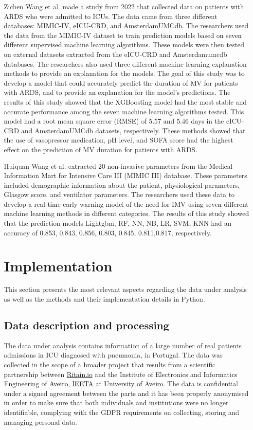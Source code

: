 \documentclass[journal]{IEEEtran} %
\begin{document}
Zichen Wang et al. \cite{Wang2022} made a study from 2022 that collected data on patients with ARDS who were admitted to ICUs. The data came from three different databases: MIMIC-IV, eICU-CRD, and AmsterdamUMCdb. The researchers used the data from the MIMIC-IV dataset to train prediction models based on seven different supervised machine learning algorithms. These models were then tested on external datasets extracted from the eICU-CRD and Amsterdamumcdb databases. The researchers also used three different machine learning explanation methods to provide an explanation for the models. The goal of this study was to develop a model that could accurately predict the duration of MV for patients with ARDS, and to provide an explanation for the model's predictions. The results of this study showed that the XGBoosting model had the most stable and accurate performance among the seven machine learning algorithms tested. This model had a root mean square error (RMSE) of 5.57 and 5.46 days in the eICU-CRD and AmsterdamUMCdb datasets, respectively. These methods showed that the use of vasopressor medication, pH level, and SOFA score had the highest effect on the prediction of MV duration for patients with ARDS.

Huiquan Wang et al. \cite{Wang2023} extracted 20 non-invasive parameters from the Medical Information Mart for Intensive Care III (MIMIC III) database. These parameters included demographic information about the patient, physiological parameters, Glasgow score, and ventilator parameters. The researchers used these data to develop a real-time early warning model of the need for IMV using seven different machine learning methods in different categories. The results of this study showed that the prediction models Lightgbm, RF, NN, NB, LR, SVM, KNN had an accuracy of 0.853, 0.843, 0.856, 0.803, 0.845, 0.811,0.817, respectively.

\section{Implementation}

This section presents the most relevant aspects regarding the data under analysis as well as the methods and their implementation details in Python.

\subsection{Data description and processing}
The data under analysis contains information of a large number of real patients admissions in ICU diagnosed with pneumonia, in Portugal.
The data was collected in the scope of a broader project that results from a scientific partnership between \hyperlink{https://ritain.io}{Ritain.io} and the Institute of Electronics and Informatics Engineering of Aveiro, \hyperlink{http://www.ieeta.pt/}{IEETA} at University of Aveiro. The data is confidential under a signed agreement between the parts and it has been properly anonymised in order to make sure that both individuals and institutions were no longer identifiable, complying with the GDPR requirements on collecting, storing and managing personal data.
\end{document}
